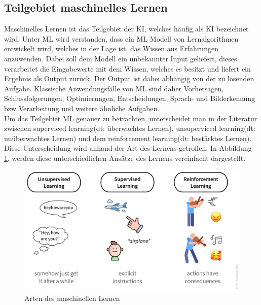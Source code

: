 \begin{onehalfspace}
    \subsection{Teilgebiet maschinelles Lernen}
    \label{subsubsec:teilgebietML}
        Maschinelles Lernen ist das Teilgebiet der \ac{KI}, welches häufig als \ac*{KI} bezeichnet wird. Unter \ac{ML} wird verstanden, dass ein \ac*{ML} Modell von Lernalgorithmen entwickelt wird, welches in der Lage ist, das Wissen aus Erfahrungen anzuwenden. Dabei soll dem Modell ein unbekannter Input geliefert, dieses verarbeitet die Eingabewerte mit dem Wissen, welches es besitzt und liefert ein Ergebnis als Output zurück. Der Output ist dabei abhängig von der zu lösenden Aufgabe. Klassische Anwendungsfälle von \ac*{ML} sind daher Vorhersagen, Schlussfolgerungen, Optimierungen, Entscheidungen, Sprach- und Bilderkennung \ac*{bzw} Verarbeitung und weitere ähnliche Aufgaben.\cite{HEGKI2019}
        \\
        Um das Teilgebiet \ac{ML} genauer zu betrachten, unterscheidet man in der Literatur zwischen \glqq{}superviced learning\grqq{}(\ac*{dt}: überwachtes Lernen), \glqq{}unsuperviced learning\grqq{}(\ac*{dt}: unüberwachtes Lernen) und dem \glqq{}reinforcement learning\grqq{}(\ac*{dt}: bestärktes Lernen).\cite{Datenkommission2019} Diese Unterscheidung wird anhand der Art des Lernens getroffen.\cite{Horn2022} In Abbildung \ref*{fig:ml_algorithms}, werden diese unterschiedlichen Ansätze des Lernens vereinfacht dargestellt. 
        \begin{figure}[h]
            \centering
            \includegraphics[width = 14cm]{Bilder/ml_algorithms.png}
            \caption{Arten des maschinellen Lernen\cite{Horn2022}}
            \label{fig:ml_algorithms}
        \end{figure}
        \\

\end{onehalfspace}
